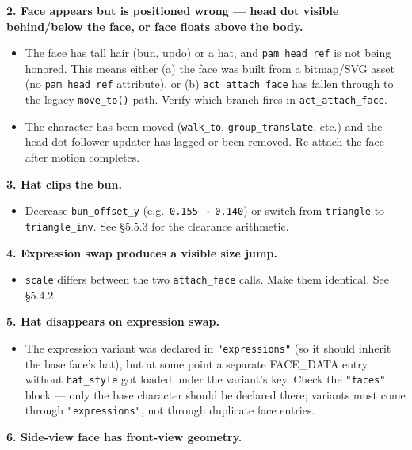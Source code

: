 \documentclass[
  11pt,
]{book}
\providecommand{\tightlist}{%
  \setlength{\itemsep}{0pt}\setlength{\parskip}{0pt}}
\begin{document}
\textbf{2. Face appears but is positioned wrong --- head dot visible
behind/below the face, or face floats above the body.}

\begin{itemize}
\tightlist
\item
  The face has tall hair (bun, updo) or a hat, and
  \texttt{pam\_head\_ref} is not being honored. This means either (a)
  the face was built from a bitmap/SVG asset (no \texttt{pam\_head\_ref}
  attribute), or (b) \texttt{act\_attach\_face} has fallen through to
  the legacy \texttt{move\_to()} path. Verify which branch fires in
  \texttt{act\_attach\_face}.
\item
  The character has been moved (\texttt{walk\_to},
  \texttt{group\_translate}, etc.) and the head-dot follower updater has
  lagged or been removed. Re-attach the face after motion completes.
\end{itemize}

\textbf{3. Hat clips the bun.}

\begin{itemize}
\tightlist
\item
  Decrease \texttt{bun\_offset\_y} (e.g.~\texttt{0.155\ →\ 0.140}) or
  switch from \texttt{triangle} to \texttt{triangle\_inv}. See §5.5.3
  for the clearance arithmetic.
\end{itemize}

\textbf{4. Expression swap produces a visible size jump.}

\begin{itemize}
\tightlist
\item
  \texttt{scale} differs between the two \texttt{attach\_face} calls.
  Make them identical. See §5.4.2.
\end{itemize}

\textbf{5. Hat disappears on expression swap.}

\begin{itemize}
\tightlist
\item
  The expression variant was declared in \texttt{"expressions"} (so it
  should inherit the base face's hat), but at some point a separate
  FACE\_DATA entry without \texttt{hat\_style} got loaded under the
  variant's key. Check the \texttt{"faces"} block --- only the base
  character should be declared there; variants must come through
  \texttt{"expressions"}, not through duplicate face entries.
\end{itemize}

\textbf{6. Side-view face has front-view geometry.}
\end{document}
